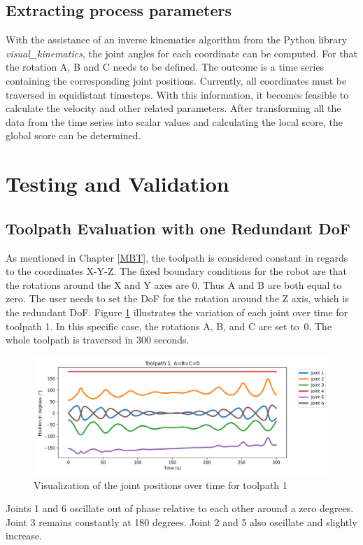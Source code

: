 \subsection{Extracting process parameters}
With the assistance of an inverse kinematics algorithm from the Python library \textit{visual\_kinematics}, the joint angles for each coordinate can be computed. For that the rotation A, B and C needs to be defined. The outcome is a time series containing the corresponding joint positions. Currently, all coordinates must be traversed in equidistant timesteps. With this information, it becomes feasible to calculate the velocity and other related parameters. After transforming all the data from the time series into scalar values and calculating the local score, the global score can be determined.
\newpage
\section{Testing and Validation}%

\subsection{Toolpath Evaluation with one Redundant DoF}
As mentioned in Chapter \ref{MBT}, the toolpath is considered constant in regards to the coordinates X-Y-Z. The fixed boundary conditions for the robot are that the rotations around the X and Y axes are 0. Thus A and B are both equal to zero. The user needs to set the DoF for the rotation around the Z axis, which is the redundant DoF. Figure \ref{TP1ABC0} illustrates the variation of each joint over time for toolpath 1. In this specific case, the rotations A, B, and C are set to~0. The whole toolpath is traversed in 300 seconds. 

\begin{figure}[H]
	\centerline{\includegraphics[width=1\textwidth]{figures/TP1ABC0.png}}
	\caption{Visualization of the joint positions over time for toolpath 1 }
	\label{TP1ABC0}
\end{figure}
Joints 1 and 6 oscillate out of phase relative to each other around a zero degrees. Joint 3 remains constantly at 180 degrees. Joint 2 and 5 also oscillate and slightly increase.

